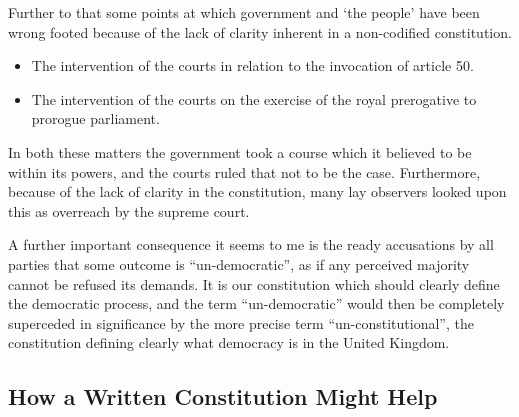 \documentclass[14pt,titlepage]{extarticle}
\begin{document}
Further to that some points at which government and `the people' have been wrong footed because of the lack of clarity inherent in a non-codified constitution.

\begin{itemize}
\item The intervention of the courts in relation to the invocation of article 50.
\item The intervention of the courts on the exercise of the royal prerogative to prorogue parliament.
\end{itemize}

In both these matters the government took a course which it believed to be within its powers, and the courts ruled that not to be the case.
Furthermore, because of the lack of clarity in the constitution, many lay observers looked upon this as overreach by the supreme court.

A further important consequence it seems to me is the ready accusations by all parties that some outcome is ``un-democratic'', as if any perceived majority cannot be refused its demands.
It is our constitution which should clearly define the democratic process, and the term ``un-democratic'' would then be completely superceded in significance by the more precise term ``un-constitutional'', the constitution defining clearly what democracy is in the United Kingdom.

\subsection{How a Written Constitution Might Help}
\end{document}
